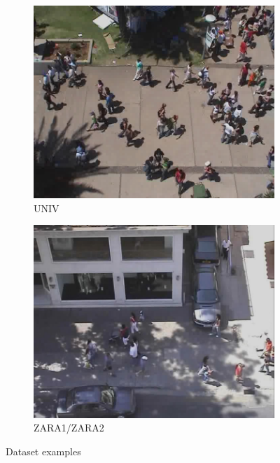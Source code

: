 \begin{figure}[hbtp]
\begin{subfigure}{0.24\textwidth}
    \centering
    \includegraphics[keepaspectratio, scale=0.11]{images/students_003.jpg}
    \caption{UNIV}
    \label{Fig:datasets3}
  \end{subfigure}
  \hfill
  \begin{subfigure}{0.24\textwidth}
    \centering
    \includegraphics[keepaspectratio, scale=0.11]{images/crowds_zara01.jpg}
    \caption{ZARA1/ZARA2}
    \label{Fig:datasets4}
  \end{subfigure}
  \vspace{-8pt}
   \caption{Dataset examples}
  \label{Fig:datasets}
\end{figure}

